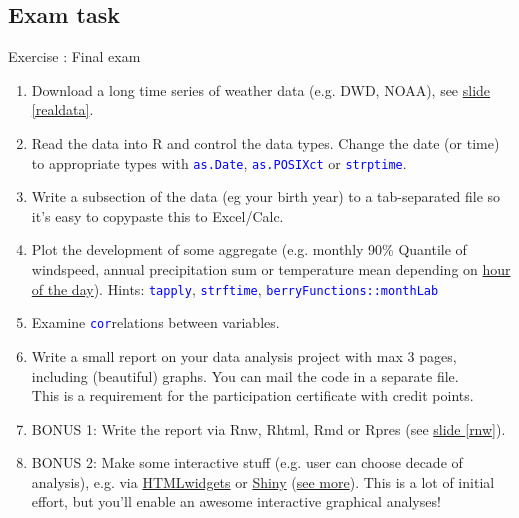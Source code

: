 \documentclass[xcolor=table,           xcolor=dvipsnames]{beamer}\usepackage[]{graphicx}\usepackage[]{color}
\newcounter{exercisecount}
\newenvironment{exercise}[1]
{%
\stepcounter{exercisecount}
\begin{block}{Exercise \arabic{exercisecount}: #1}
}
{%
\end{block} }
\newcommand{\rcode}[1]{\texttt{\textcolor{Blue}{#1}}} %
\begin{document}
\subsection{Exam task}

\begin{frame}
\begin{exercise}{Final exam} %
{\footnotesize
\begin{enumerate}
  \item Download a long time series of weather data (e.g. DWD, NOAA), see \hyperlink{realdata}{slide \ref{realdata}}.
  \item Read the data into R and control the data types. Change the date (or time) to appropriate types with \rcode{as.Date}, \rcode{as.POSIXct} or \rcode{strptime}.
  \item Write a subsection of the data (eg your birth year) to a tab-separated file so it's easy to copypaste this to Excel/Calc.
  \item Plot the development of some aggregate (e.g. monthly 90\% Quantile of windspeed, annual precipitation sum or temperature mean depending on \href{ftp://ftp-cdc.dwd.de/pub/CDC/observations_germany/climate/hourly/}{hour of the day}).
  Hints: \rcode{tapply}, \rcode{strftime}, \rcode{berryFunctions::monthLab}
  \item Examine \rcode{cor}relations between variables.
  \item Write a small report on your data analysis project with max 3 pages, including (beautiful) graphs. You can mail the code in a separate file.\\
  \alert{This is a requirement for the participation certificate with credit points.}
  \item BONUS 1: Write the report via Rnw, Rhtml, Rmd or Rpres (see \hyperlink{rnw}{slide \ref{rnw}}).
  \item BONUS 2: Make some interactive stuff (e.g. user can choose decade of analysis), e.g. via \href{http://www.htmlwidgets.org}{HTMLwidgets} or \href{http://shiny.rstudio.com}{Shiny} (\href{http://biostatistics.dk/useR/IntGraph.html\#1}{see more}). This is a lot of initial effort, but you'll enable an awesome interactive graphical analyses!
\end{enumerate}
}
\end{exercise}
\end{frame}

\end{document}
